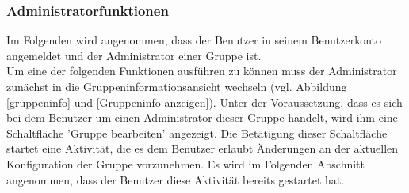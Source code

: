 \documentclass[parskip=full]{scrartcl}
\begin{document}
\subsubsection{Administratorfunktionen}
Im Folgenden wird angenommen, dass der Benutzer in seinem Benutzerkonto angemeldet und der Administrator einer Gruppe ist.\\
Um eine der folgenden Funktionen ausführen zu können muss der Administrator zunächst in die Gruppeninformationsansicht wechseln (vgl. Abbildung \ref{gruppeninfo} und \ref{Gruppeninfo anzeigen}). Unter der Voraussetzung, dass es sich bei dem Benutzer um einen Administrator dieser Gruppe handelt, wird ihm eine Schaltfläche 'Gruppe bearbeiten' angezeigt. Die Betätigung dieser Schaltfläche startet eine Aktivität, die es dem Benutzer erlaubt Änderungen an der aktuellen Konfiguration der Gruppe vorzunehmen. Es wird im Folgenden Abschnitt angenommen, dass der Benutzer diese Aktivität bereits gestartet hat.
\end{document}
